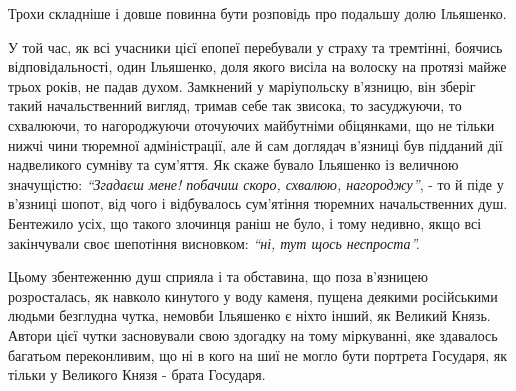 \documentclass[a4paper,20pt]{report}
\begin{document}
Трохи складніше і довше повинна бути розповідь про подальшу долю Ільяшенко.

У той час, як всі учасники цієї епопеї перебували у страху та тремтінні,
боячись відповідальності, один Ільяшенко, доля якого висіла на волоску на протязі
майже трьох років, не падав духом. Замкнений у маріупольску в'язницю, він зберіг такий 
начальственний вигляд, тримав себе так звисока, то засуджуючи, то схвалюючи, то
нагороджуючи оточуючих майбутніми обіцянками,
що не тільки нижчі чини тюремної адміністрації, але й сам доглядач в'язниці був підданий
дії надвеликого сумніву та сум'яття. Як скаже бувало Ільяшенко із величною 
значущістю: \emph{``Згадаєш мене! побачиш скоро, схвалюю, нагороджу''}, - то й піде у в'язниці шопот,
від чого і відбувалось сум'ятіння тюремних начальственних душ. Бентежило усіх, що такого
злочинця раніш не було, і тому недивно, якщо всі закінчували своє шепотіння
висновком: \emph{``ні, тут щось неспроста''.}

Цьому збентеженню душ сприяла і та обставина, що поза в'язницею розросталась,
як навколо кинутого у воду каменя, пущена деякими російськими людьми безглудна
чутка, немовби Ільяшенко є ніхто інший, як Великий Князь. Автори цієї чутки засновували
свою здогадку на тому міркуванні, яке здавалось багатьом переконливим, що ні в кого на шиї
не могло бути портрета Государя, як тільки у Великого Князя - брата Государя.
\end{document}
